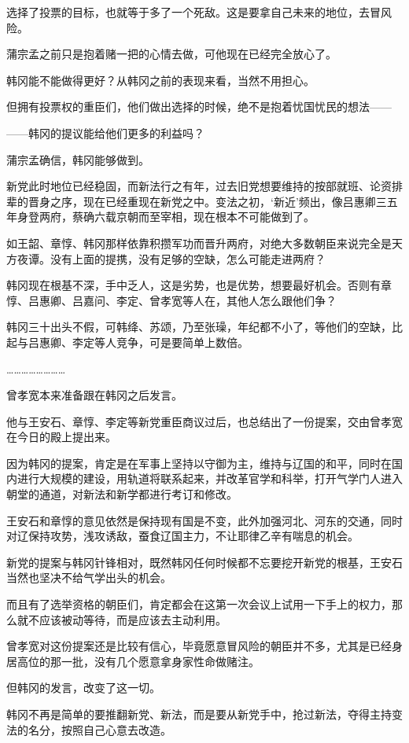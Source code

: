 选择了投票的目标，也就等于多了一个死敌。这是要拿自己未来的地位，去冒风险。

蒲宗孟之前只是抱着赌一把的心情去做，可他现在已经完全放心了。

韩冈能不能做得更好？从韩冈之前的表现来看，当然不用担心。

但拥有投票权的重臣们，他们做出选择的时候，绝不是抱着忧国忧民的想法——

——韩冈的提议能给他们更多的利益吗？

蒲宗孟确信，韩冈能够做到。

新党此时地位已经稳固，而新法行之有年，过去旧党想要维持的按部就班、论资排辈的晋身之序，现在已经重现在新党之中。变法之初，‘新近’频出，像吕惠卿三五年身登两府，蔡确六载京朝而至宰相，现在根本不可能做到了。

如王韶、章惇、韩冈那样依靠积攒军功而晋升两府，对绝大多数朝臣来说完全是天方夜谭。没有上面的提携，没有足够的空缺，怎么可能走进两府？

韩冈现在根基不深，手中乏人，这是劣势，也是优势，想要最好机会。否则有章惇、吕惠卿、吕嘉问、李定、曾孝宽等人在，其他人怎么跟他们争？

韩冈三十出头不假，可韩绛、苏颂，乃至张璪，年纪都不小了，等他们的空缺，比起与吕惠卿、李定等人竞争，可是要简单上数倍。

……………………

曾孝宽本来准备跟在韩冈之后发言。

他与王安石、章惇、李定等新党重臣商议过后，也总结出了一份提案，交由曾孝宽在今日的殿上提出来。

因为韩冈的提案，肯定是在军事上坚持以守御为主，维持与辽国的和平，同时在国内进行大规模的建设，用轨道将联系起来，并改革官学和科举，打开气学门人进入朝堂的通道，对新法和新学都进行考订和修改。

王安石和章惇的意见依然是保持现有国是不变，此外加强河北、河东的交通，同时对辽保持攻势，浅攻诱敌，蚕食辽国主力，不让耶律乙辛有喘息的机会。

新党的提案与韩冈针锋相对，既然韩冈任何时候都不忘要挖开新党的根基，王安石当然也坚决不给气学出头的机会。

而且有了选举资格的朝臣们，肯定都会在这第一次会议上试用一下手上的权力，那么就不应该被动等待，而是应该去主动利用。

曾孝宽对这份提案还是比较有信心，毕竟愿意冒风险的朝臣并不多，尤其是已经身居高位的那一批，没有几个愿意拿身家性命做赌注。

但韩冈的发言，改变了这一切。

韩冈不再是简单的要推翻新党、新法，而是要从新党手中，抢过新法，夺得主持变法的名分，按照自己心意去改造。

